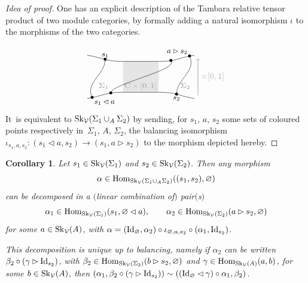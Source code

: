 \documentclass[pdftex]{sigma}%
\numberwithin{equation}{section}
\newtheorem{Corollary}[Theorem]{Corollary}
\newcommand{\Hom}{\operatorname{Hom}}
\begin{document}
\begin{proof}[Idea of proof]
One has an explicit description of the Tambara relative tensor product of two module categories, by formally adding a natural isomorphism $\iota$ to the morphisms of the two categories.

$$
\begin{tikzpicture}[baseline = 15pt, xscale = 1.5, yscale = 1.3]
\fill[gray!20] (4.5,0.5) -- (3.5,0.5)-- (3.5,1.5) -- (4.5,1.5)--cycle;
\node[gray!60] at (4.1,0.7){\small $\mathbf{\Sigma_1 \quad\quad C \times [0,1]\quad \quad\quad \Sigma_2}$};
\draw[gray!60, ->, thick] (5.6,0.4)-- ++(0,1.2) node[midway, right]{$\times [0,1]$};
\draw (4.5,0.5) -- (3.5,0.5)	.. controls (3,0.5 ) and (3,0.4 ) .. (2.5,0.3) coordinate[pos = 0.9] (EEM) coordinate[pos = 0.3] (EMA) ;
\draw (4.5,0.5)	.. controls (5,0.5 ) and (5,0.4 ) .. (5.5,0.3)coordinate[pos = 0.5] (EN);
\draw (4.5,1.5) -- (3.5,1.5)	.. controls (3,1.5 ) and (3,1.6 ) .. (2.5,1.7) coordinate[pos = 0.5] (EM) ;
\draw (5.5,1.7)	.. controls (5,1.6 ) and (5,1.5 ) .. (4.5,1.5)coordinate[pos = 0.7] (ENA) coordinate[pos = 0.1] (EEN);
\draw (EM) node{\small $\bullet$} node[above = -1pt]{\small $s_1$} .. controls ++(0,-0.5) and ++(-0.2,0.5) .. (EEM) node{\small $\bullet$} node[below right = -1pt]{\small $s_1\lhd a$};
\draw (EN) node{\small $\bullet$} node[below = -1pt]{\small $s_2$} .. controls ++(0,0.5) and ++(0.2,-0.5) .. (EEN) node{\small $\bullet$} node[above left = -1pt]{\small $a \rhd s_2$} node[pos = 0.3,right]{};
\draw (EMA) node{\small $\bullet$} .. controls ++(0,0.3) and ++(0.25,-0.3) .. (ENA) node[pos = 0.25,above]{} node{\small $\bullet$} node[pos = 0.75,below]{};
\end{tikzpicture}
$$
It~is equivalent to ${\rm Sk}_\mathcal{V}(\Sigma_1\cup_{A} \Sigma_2)$ by sending, for $s_1$, $a$, $s_2$ some sets of coloured points respectively in~$\Sigma_1$, $A$, $\Sigma_2$, the balancing isomorphism $\iota_{s_1,a,s_2} \colon (s_1\lhd a,s_2) \to (s_1,a \rhd s_2)$ to the morphism depicted hereby.
\end{proof}


\begin{Corollary}\label{corrMorphSkRecoll}
Let $s_1\in {\rm Sk}_\mathcal{V}(\Sigma_1)$ and $s_2\in {\rm Sk}_\mathcal{V}(\Sigma_2)$. Then any morphism
\[
\alpha\in\Hom_{{\rm Sk}_\mathcal{V}(\Sigma_1\cup_A\Sigma_2)}((s_1,s_2),\varnothing)
\]
can be decomposed in a $($linear combination of$)$ pair$($s$)$
\[
\alpha_1 \in \Hom_{{\rm Sk}_\mathcal{V}(\Sigma_1)}(s_1,\varnothing\lhd a),\qquad
\alpha_2\in\Hom_{{\rm Sk}_\mathcal{V}(\Sigma_2)}(a\rhd s_2,\varnothing)
\]
for some $a \in {\rm Sk}_\mathcal{V}(A)$, with $\alpha = ({\rm Id}_\varnothing , \alpha_2) \circ \iota_{\varnothing,a,s_2} \circ (\alpha_1 , {\rm Id}_{s_2})$.

This decomposition is unique up to balancing, namely if $\alpha_2$ can be written $\beta_2 \circ (\gamma\rhd {\rm Id}_{s_2})$, with $\beta_2\in\Hom_{{\rm Sk}_\mathcal{V}(\Sigma_2)}(b\rhd s_2,\varnothing)$ and $\gamma\in\Hom_{{\rm Sk}_\mathcal{V}(A)}(a,b)$, for some $b\in {\rm Sk}_\mathcal{V}(A)$, then $(\alpha_1,\beta_2\circ (\gamma\rhd {\rm Id}_{s_2})) \sim (({\rm Id}_\varnothing\lhd\gamma) \circ \alpha_1, \beta_2)$.
\end{Corollary}
\end{document}
